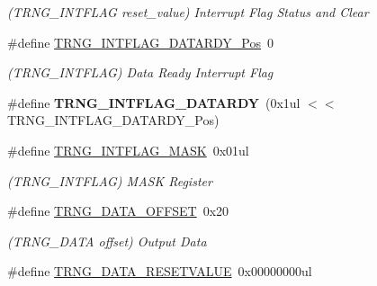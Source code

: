 \begin{DoxyCompactItemize}
\begin{DoxyCompactList}\small\item\em (T\+R\+N\+G\+\_\+\+I\+N\+T\+F\+L\+A\+G reset\+\_\+value) Interrupt Flag Status and Clear \end{DoxyCompactList}\item 
\hypertarget{group___s_a_m_l21___t_r_n_g_ga0087ab9a8864f665defd61186117b33c}{}\#define \hyperlink{group___s_a_m_l21___t_r_n_g_ga0087ab9a8864f665defd61186117b33c}{T\+R\+N\+G\+\_\+\+I\+N\+T\+F\+L\+A\+G\+\_\+\+D\+A\+T\+A\+R\+D\+Y\+\_\+\+Pos}~0\label{group___s_a_m_l21___t_r_n_g_ga0087ab9a8864f665defd61186117b33c}

\begin{DoxyCompactList}\small\item\em (T\+R\+N\+G\+\_\+\+I\+N\+T\+F\+L\+A\+G) Data Ready Interrupt Flag \end{DoxyCompactList}\item 
\hypertarget{group___s_a_m_l21___t_r_n_g_gadd312fddac296af9db1343cddc0835c0}{}\#define {\bfseries T\+R\+N\+G\+\_\+\+I\+N\+T\+F\+L\+A\+G\+\_\+\+D\+A\+T\+A\+R\+D\+Y}~(0x1ul $<$$<$ T\+R\+N\+G\+\_\+\+I\+N\+T\+F\+L\+A\+G\+\_\+\+D\+A\+T\+A\+R\+D\+Y\+\_\+\+Pos)\label{group___s_a_m_l21___t_r_n_g_gadd312fddac296af9db1343cddc0835c0}

\item 
\hypertarget{group___s_a_m_l21___t_r_n_g_gacd3946436f1cf5b02f455b7b71deca2d}{}\#define \hyperlink{group___s_a_m_l21___t_r_n_g_gacd3946436f1cf5b02f455b7b71deca2d}{T\+R\+N\+G\+\_\+\+I\+N\+T\+F\+L\+A\+G\+\_\+\+M\+A\+S\+K}~0x01ul\label{group___s_a_m_l21___t_r_n_g_gacd3946436f1cf5b02f455b7b71deca2d}

\begin{DoxyCompactList}\small\item\em (T\+R\+N\+G\+\_\+\+I\+N\+T\+F\+L\+A\+G) M\+A\+S\+K Register \end{DoxyCompactList}\item 
\hypertarget{group___s_a_m_l21___t_r_n_g_ga89087d36e2179c6fb853d0aa606bce3e}{}\#define \hyperlink{group___s_a_m_l21___t_r_n_g_ga89087d36e2179c6fb853d0aa606bce3e}{T\+R\+N\+G\+\_\+\+D\+A\+T\+A\+\_\+\+O\+F\+F\+S\+E\+T}~0x20\label{group___s_a_m_l21___t_r_n_g_ga89087d36e2179c6fb853d0aa606bce3e}

\begin{DoxyCompactList}\small\item\em (T\+R\+N\+G\+\_\+\+D\+A\+T\+A offset) Output Data \end{DoxyCompactList}\item 
\hypertarget{group___s_a_m_l21___t_r_n_g_ga44c5f90ae9f0bd898315841e8c6b7077}{}\#define \hyperlink{group___s_a_m_l21___t_r_n_g_ga44c5f90ae9f0bd898315841e8c6b7077}{T\+R\+N\+G\+\_\+\+D\+A\+T\+A\+\_\+\+R\+E\+S\+E\+T\+V\+A\+L\+U\+E}~0x00000000ul\label{group___s_a_m_l21___t_r_n_g_ga44c5f90ae9f0bd898315841e8c6b7077}


\end{DoxyCompactItemize}

